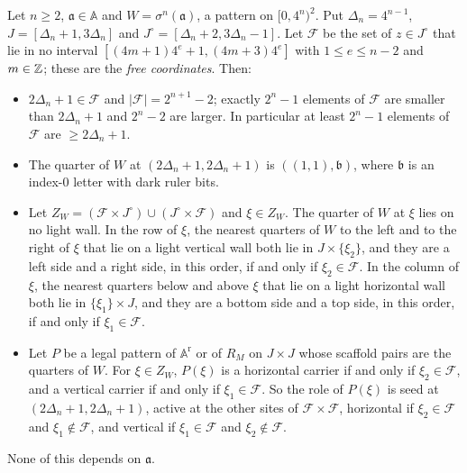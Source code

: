 \begin{proposition}\label{prop:board}
Let $n\ge2$, $\mathfrak a\in\mathbb A$ and $W=\sigma^n(\mathfrak a)$, a pattern on $[0,4^n)^2$. Put $\Delta_n=4^{n-1}$, $J=[\Delta_n+1,3\Delta_n]$ and $J^\circ=[\Delta_n+2,3\Delta_n-1]$. Let $\mathcal F$ be the set of $z\in J^\circ$ that lie in no interval $[(4m+1)4^e+1,(4m+3)4^e]$ with $1\le e\le n-2$ and $m\in\mathbb{Z}$; these are the \emph{free coordinates}. Then:
\begin{itemize}
\item[(a)] $2\Delta_n+1\in\mathcal F$ and $|\mathcal F|=2^{n+1}-2$; exactly $2^n-1$ elements of $\mathcal F$ are smaller than $2\Delta_n+1$ and $2^n-2$ are larger. In particular at least $2^n-1$ elements of $\mathcal F$ are $\ge2\Delta_n+1$.
\item[(b)] The quarter of $W$ at $(2\Delta_n+1,2\Delta_n+1)$ is $((1,1),\mathfrak b)$, where $\mathfrak b$ is an index-$0$ letter with dark ruler bits.
\item[(c)] Let $Z_W=(\mathcal F\times J^\circ)\cup(J^\circ\times\mathcal F)$ and $\xi\in Z_W$. The quarter of $W$ at $\xi$ lies on no light wall. In the row of $\xi$, the nearest quarters of $W$ to the left and to the right of $\xi$ that lie on a light vertical wall both lie in $J\times\{\xi_2\}$, and they are a left side and a right side, in this order, if and only if $\xi_2\in\mathcal F$. In the column of $\xi$, the nearest quarters below and above $\xi$ that lie on a light horizontal wall both lie in $\{\xi_1\}\times J$, and they are a bottom side and a top side, in this order, if and only if $\xi_1\in\mathcal F$.
\item[(d)] Let $P$ be a legal pattern of $\mathbb A^{\mathrm r}$ or of $R_M$ on $J\times J$ whose scaffold pairs are the quarters of $W$. For $\xi\in Z_W$, $P(\xi)$ is a horizontal carrier if and only if $\xi_2\in\mathcal F$, and a vertical carrier if and only if $\xi_1\in\mathcal F$. So the role of $P(\xi)$ is seed at $(2\Delta_n+1,2\Delta_n+1)$, active at the other sites of $\mathcal F\times\mathcal F$, horizontal if $\xi_2\in\mathcal F$ and $\xi_1\notin\mathcal F$, and vertical if $\xi_1\in\mathcal F$ and $\xi_2\notin\mathcal F$.
\end{itemize}
None of this depends on $\mathfrak a$.
\end{proposition}

